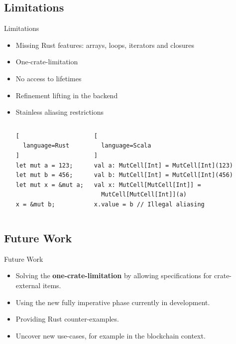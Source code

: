 \subsection{Limitations}

\begin{frame}[fragile]{Limitations}
\begin{itemize}
\item Missing Rust features: arrays, loops, iterators and closures
\item One-crate-limitation
\item No access to lifetimes
\item Refinement lifting in the backend
\item Stainless aliasing restrictions
\begin{columns}[T]
\begin{lstlisting}[
  language=Rust
]
let mut a = 123;
let mut b = 456;
let mut x = &mut a;

x = &mut b;
\end{lstlisting}

\begin{lstlisting}[
  language=Scala
]
val a: MutCell[Int] = MutCell[Int](123)
val b: MutCell[Int] = MutCell[Int](456)
val x: MutCell[MutCell[Int]] =
  MutCell[MutCell[Int]](a)
x.value = b // Illegal aliasing
\end{lstlisting}
\end{columns}
\end{itemize}
\end{frame}

\subsection{Future Work}

\begin{frame}{Future Work}
\begin{itemize}
  \item Solving the \textbf{one-crate-limitation} by allowing specifications
  for crate-external items.

  \item Using the new fully imperative phase currently in development.

  \item Providing Rust counter-examples.

  \item Uncover new use-cases, for example in the blockchain context.
\end{itemize}
\end{frame}

